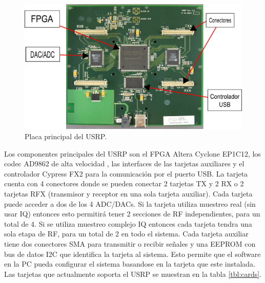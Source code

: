 \begin{figure}[t]
\centering
	\includegraphics[width=5.5in]{figs/usrp}
	\caption{Placa principal del USRP.}
	\label{fig:sisusrp}
\end{figure}

Los componentes principales del USRP son el FPGA Altera Cyclone EP1C12, los codec AD9862 de alta
velocidad , las interfaces de las tarjetas auxiliares y el controlador Cypress FX2 para la
comunicaci\'on por el puerto USB. La tarjeta cuenta con 4 conectores donde se pueden conectar 2
tarjetas TX y 2 RX o 2 tarjetas RFX (transmisor y receptor en una sola tarjeta auxiliar). Cada
tarjeta puede acceder a dos de los 4 ADC/DACs. Si la tarjeta utiliza muestreo real (sin usar IQ)
entonces esto permitir\'a tener 2 secciones de RF independientes, para un total de 4. Si se utiliza
muestreo complejo IQ entonces cada tarjeta tendra una sola etapa de RF, para un total de 2 en todo
el sistema. Cada tarjeta auxiliar tiene dos conectores SMA para transmitir o recibir se\~nales y una
EEPROM con bus de datos I2C que identifica la tarjeta al sistema. Esto permite que el software en la
PC pueda configurar el sistema basandose en la tarjeta que este instalada. Las tarjetas que
actualmente soporta el USRP se muestran en la tabla \ref{tbl:cards}.

